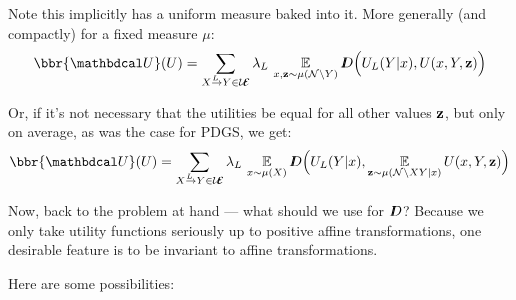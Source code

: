 \documentclass{article}
\newcommand\UEd{\mathcal U\!\!\Ed}
\begin{document}
    Note this implicitly has a uniform measure baked into it. More generally (and compactly) for a fixed measure $\mu$:
    \begin{equation}
        \bbr{\dg U}(U) =
             \sum_{\ed LXY \in \UEd} \lambda_L\, \Ex_{\substack{x,\mat z \sim \mu(\N \setminus Y)}}
             \thickD\Big( U_L(Y | x),  U(x,Y, \mat z) \Big)
    \end{equation}
    
    Or, if it's not necessary that the utilities be equal for all other values $\mathbf{z}$, but only on average, as was the case for PDGS, we get:
    \begin{equation}
        \bbr{\dg U}(U) =
             \sum_{\ed LXY \in \UEd} \lambda_L\, \Ex_{x \sim \mu(X)}
             \thickD\Big( U_L(Y | x),  \Ex_{\mat z \sim \mu(\N\setminus XY|x)}U(x,Y, \mat z) \Big)
    \end{equation}

     
    Now, back to the problem at hand --- what should we use for $I\mkern-8muD$? Because we only take utility functions seriously up to positive affine transformations, one desirable feature is to be invariant to affine transformations.
    
    Here are some possibilities:
    
\end{document}

